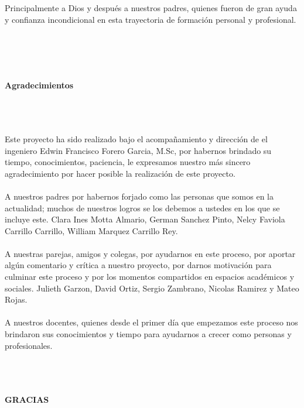 \begin{flushright}
\begin{minipage}{8cm}
    \noindent
        \small
		Principalmente a Dios y después a nuestros padres, quienes fueron de gran ayuda y confianza incondicional en esta trayectoria de formación personal y profesional.  \\[4.0cm]\\
        
\end{minipage}
\end{flushright}


\newpage{\clearpage}
\thispagestyle{empty} \textbf{}\normalsize
\\\\\\%
\textbf{\LARGE Agradecimientos}
\setcounter{page}{5}
\\\\\\
Este proyecto ha sido realizado bajo el acompañamiento y dirección de el ingeniero Edwin Francisco Forero Garcia, M.Sc, por habernos brindado su tiempo, conocimientos, paciencia, le expresamos nuestro más sincero agradecimiento por hacer posible la realización de este proyecto.\\\\
A nuestros padres por habernos forjado como las personas que somos en la actualidad; muchos de nuestros logros se los debemos a ustedes en los que se incluye este. Clara Ines Motta Almario, German Sanchez Pinto, Nelcy Faviola Carrillo Carrillo, William Marquez Carrillo Rey.  \\\\
A nuestras parejas, amigos y colegas, por ayudarnos en este proceso, por aportar algún comentario y crítica a nuestro proyecto, por darnos motivación para culminar este proceso y por los momentos compartidos en espacios académicos y sociales. Julieth Garzon, David Ortiz, Sergio Zambrano, Nicolas Ramirez y Mateo Rojas.  \\\\
A nuestros docentes, quienes desde el primer día que empezamos este proceso nos brindaron sus conocimientos y tiempo para ayudarnos a crecer como personas y profesionales.\\\\\\\\
\begin{flushright}
\textbf{\large{ GRACIAS}}
\end{flushright}



